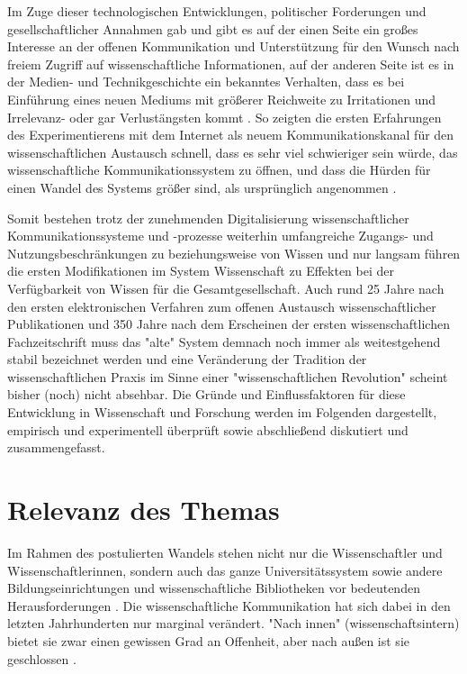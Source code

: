Im Zuge dieser technologischen Entwicklungen, politischer Forderungen und gesellschaftlicher Annahmen gab und gibt es auf der einen Seite ein großes Interesse an der offenen Kommunikation und Unterstützung für den Wunsch nach freiem Zugriff auf wissenschaftliche Informationen, auf der anderen Seite ist es in der Medien- und Technikgeschichte ein bekanntes Verhalten, dass es bei Einführung eines neuen Mediums mit größerer Reichweite zu Irritationen \cite{Naeder_2010} und Irrelevanz- oder gar Verlustängsten kommt \cite{hagner_2015_sache_buches}. So zeigten die ersten Erfahrungen des Experimentierens mit dem Internet als neuem Kommunikationskanal für den wissenschaftlichen Austausch schnell, dass es sehr viel schwieriger sein würde, das wissenschaftliche Kommunikationssystem zu öffnen, und dass die Hürden für einen Wandel des Systems größer sind, als ursprünglich angenommen \cite{Bjoerk_2004}.

Somit bestehen trotz der zunehmenden Digitalisierung wissenschaftlicher Kommunikationssysteme und -prozesse weiterhin umfangreiche Zugangs- und Nutzungsbeschränkungen zu beziehungsweise von Wissen und nur langsam führen die ersten Modifikationen im System Wissenschaft zu Effekten bei der Verfügbarkeit von Wissen für die Gesamtgesellschaft. Auch rund 25 Jahre nach den ersten elektronischen Verfahren zum offenen Austausch wissenschaftlicher Publikationen und 350 Jahre nach dem Erscheinen der ersten wissenschaftlichen Fachzeitschrift muss das "alte" System demnach noch immer als weitestgehend stabil bezeichnet werden \cite{Brembs_2015} \cite{Hanekop_2014} \cite{Warnke_2012} und eine Veränderung der Tradition der wissenschaftlichen Praxis im Sinne einer "wissenschaftlichen Revolution" \cite{Kuhn_2012} scheint bisher (noch) nicht absehbar. Die Gründe und Einflussfaktoren für diese Entwicklung in Wissenschaft und Forschung werden im Folgenden dargestellt, empirisch und experimentell überprüft sowie abschließend diskutiert und zusammengefasst.

\section{Relevanz des Themas}

Im Rahmen des postulierten Wandels stehen nicht nur die Wissenschaftler und Wissenschaftlerinnen, sondern auch das ganze Universitätssystem sowie andere Bildungseinrichtungen und wissenschaftliche Bibliotheken vor bedeutenden Herausforderungen \cite{muller_2010_open} \cite{Harter_2006} \cite{Guedon_2004} \cite{Osterloh_2008} \cite{Beverungen_2014}. Die wissenschaftliche Kommunikation hat sich dabei in den letzten Jahrhunderten nur marginal verändert. "Nach innen" (wissenschaftsintern) bietet sie zwar einen gewissen Grad an Offenheit, aber nach außen ist sie geschlossen \cite{Kelty_2004}.

